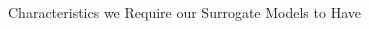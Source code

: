 \begin{frame}[c]{Characteristics we Require our Surrogate Models to Have}
\begin{columns}[T]
\begin{column}{.48\textwidth}

\end{column}%
\end{columns}

\end{frame}

